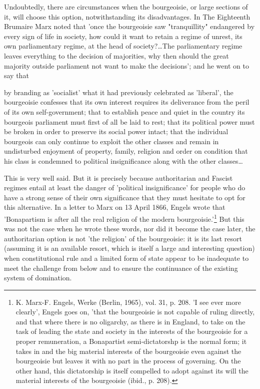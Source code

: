 Undoubtedly, there are circumstances when the bourgeoisie, or large sections of it, will choose this option, notwithstanding its disadvantages. In The Eighteenth Brumaire Marx noted that 'once the bourgeoisie saw "tranquillity" endangered by every sign of life in society, how could it want to retain a regime of unrest, its own parliamentary regime, at the head of society?\dots The parliamentary regime leaves everything to the decision of majorities, why then should the great majority outside parliament not want to make the decisions'; and he went on to say that
\begin{displayquote}
    by branding as 'socialist' what it had previously celebrated as 'liberal', the bourgeoisie confesses that its own interest requires its deliverance from the peril of its own self-government; that to establish peace and quiet in the country its bourgeois parliament must first of all be laid to rest; that its political power must be broken in order to preserve its social power intact; that the individual bourgeois can only continue to exploit the other classes and remain in undisturbed enjoyment of property, family, religion and order on condition that his class is condemned to political insignificance along with the other classes\dots{}
\end{displayquote}

This is very well said. But it is precisely because authoritarian and Fascist regimes entail at least the danger of 'political insignificance' for people who do have a strong sense of their own significance that they must hesitate to opt for this alternative. In a letter to Marx on 13 April 1866, Engels wrote that 'Bonapartism is after all the real religion of the modern bourgeoisie.'\footnote{K. Marx-F. Engels, Werke (Berlin, 1965), vol. 31, p. 208. 'I see ever more clearly', Engels goes on, 'that the bourgeoisie is not capable of ruling directly, and that where there is no oligarchy, as there is in England, to take on the task of leading the state and society in the interests of the bourgeoisie for a proper remuneration, a Bonapartist semi\hyp{}dictatorshp is the normal form; it takes in and the big material interests of the bourgeoisie even against the bourgeoisie but leaves it with no part in the process of governing. On the other hand, this dictatorship is itself compelled to adopt against its will the material interests of the bourgeoisie (ibid., p. 208).} But this was not the case when he wrote these words, nor did it become the case later, the authoritarian option is not 'the religion' of the bourgeoisie: it is its last resort (assuming it is an available resort, which is itself a large and interesting question) when constitutional rule and a limited form of state appear to be inadequate to meet the challenge from below and to ensure the continuance of the existing system of domination.

